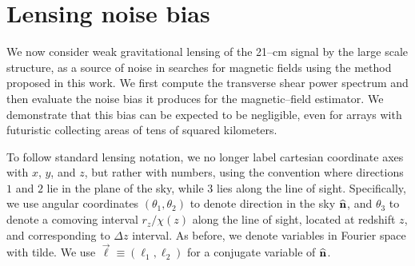 \section{Lensing noise bias}

We now consider weak gravitational lensing of the 21--cm signal by the large scale structure, as a source of noise in searches for magnetic fields using the method proposed in this work. We first compute the transverse shear power spectrum and then evaluate the noise bias it produces for the magnetic--field estimator. We demonstrate that this bias can be expected to be negligible, even for arrays with futuristic collecting areas of tens of squared kilometers.

To follow standard lensing notation, we no longer label cartesian coordinate axes with $x$, $y$, and $z$, but rather with numbers, using the convention where directions $1$ and $2$ lie in the plane of the sky, while $3$ lies along the line of sight. Specifically, we use angular coordinates $(\theta_1, \theta_2)$ to denote direction in the sky ${\bf{\widehat n}}$, and $\theta_3$ to denote a comoving interval $r_z/\chi(z)$ along the line of sight, located at redshift $z$, and corresponding to $\Delta z$ interval. As before, we denote variables in Fourier space with tilde. We use $\vec{\ell}\equiv(\ell_1,\ell_2)$ for a conjugate variable of ${\bf{\widehat n}}$. 
 
